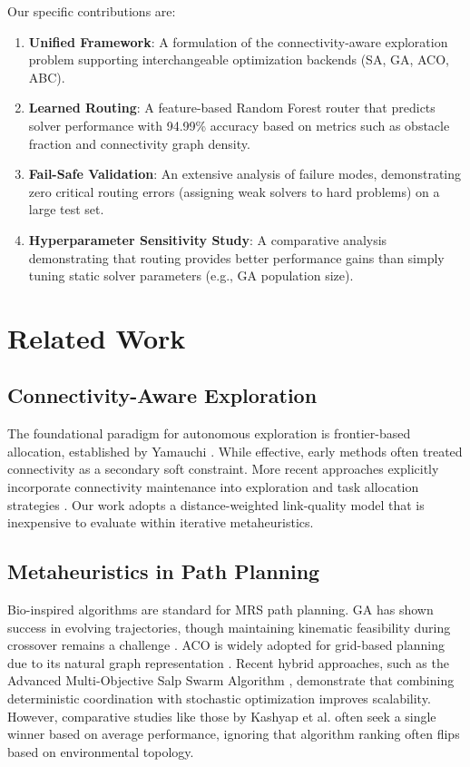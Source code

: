 \documentclass[conference]{IEEEtran}
\begin{document}
Our specific contributions are:
\begin{enumerate}
    \item \textbf{Unified Framework}: A formulation of the connectivity-aware exploration problem supporting interchangeable optimization backends (SA, GA, ACO, ABC).
    \item \textbf{Learned Routing}: A feature-based Random Forest router that predicts solver performance with 94.99\% accuracy based on metrics such as obstacle fraction and connectivity graph density.
    \item \textbf{Fail-Safe Validation}: An extensive analysis of failure modes, demonstrating zero critical routing errors (assigning weak solvers to hard problems) on a large test set.
    \item \textbf{Hyperparameter Sensitivity Study}: A comparative analysis demonstrating that routing provides better performance gains than simply tuning static solver parameters (e.g., GA population size).
\end{enumerate}

\section{Related Work}
\label{sec:related}

\subsection{Connectivity-Aware Exploration}
The foundational paradigm for autonomous exploration is frontier-based allocation, established by Yamauchi \cite{yamauchi1997frontier}. While effective, early methods often treated connectivity as a secondary soft constraint. More recent approaches explicitly incorporate connectivity maintenance into exploration and task allocation strategies \cite{yan2023cooperative}. Our work adopts a distance-weighted link-quality model that is inexpensive to evaluate within iterative metaheuristics.

\subsection{Metaheuristics in Path Planning}
Bio-inspired algorithms are standard for MRS path planning. GA has shown success in evolving trajectories, though maintaining kinematic feasibility during crossover remains a challenge \cite{huang2020coverage}. ACO is widely adopted for grid-based planning due to its natural graph representation \cite{dorigo2024aco}. Recent hybrid approaches, such as the Advanced Multi-Objective Salp Swarm Algorithm \cite{amet2025}, demonstrate that combining deterministic coordination with stochastic optimization improves scalability. However, comparative studies like those by Kashyap et al. \cite{kashyap2025simulations} often seek a single winner based on average performance, ignoring that algorithm ranking often flips based on environmental topology.
\end{document}
